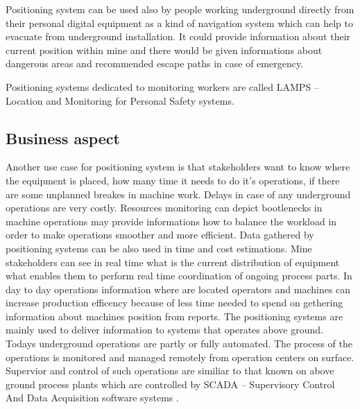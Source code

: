 \documentclass[../main.tex]{subfiles}
\begin{document}
Positioning system can be used also by people working underground directly from their personal digital equipment\cite{Thesis_CM} as a kind of navigation system which can help to evacuate from underground installation. It could provide information about their current position within mine and there would be given informations about dangerous areas and recommended escape paths in case of emergency.

Positioning systems dedicated to monitoring workers are called LAMPS -- Location and Monitoring for Personal Safety systems.

\subsection{Business aspect} %
\label{sub:business_aspect}

Another use case for positioning system is that stakeholders want to know where the equipment is placed, how many time it needs to do it's operations, if there are some unplanned breakes in machine work. Delays in case of any underground operations are very costly. Resources monitoring can depict bootlenecks in machine operations may provide informations how to balance the workload in order to make operations smoother and more efficient. Data gathered by positioning systems can be also used in time and cost estimations. Mine stakeholders can see in real time what is the current distribution of equipment what enables them to perform real time coordination of ongoing process parts. In day to day operations information where are located operators and machines can increase production efficency because of less time needed to spend on gethering information about machines position from reports. \cite{thesis_tablet_positioning} The positioning systems are mainly used to deliver information to systems that operates above ground. Todays underground operations are partly or fully automated. The process of the operations is monitored and managed remotely from operation centers on surface. Supervior and control of such operations are similiar to that known on above ground process plants which are controlled by SCADA -- Supervisory Control And Data Acquisition software systems \cite{Thesis_CM}.
\end{document}
